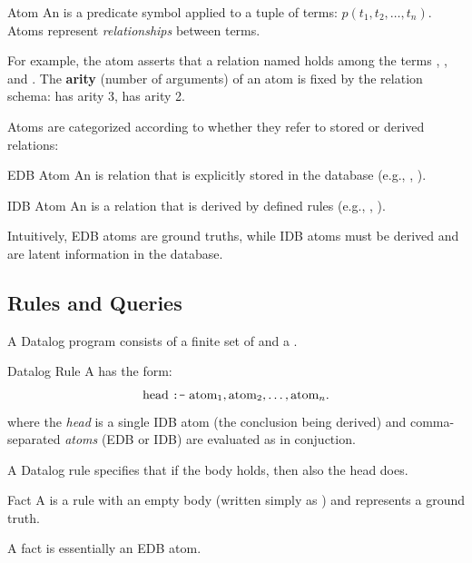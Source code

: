 \begin{definition}{Atom}
    An  is a predicate symbol applied to a tuple of terms: \(p(t_1, t_2, \dots, t_n)\). Atoms represent \emph{relationships} between terms.
\end{definition}
For example, the atom  asserts that a relation named  holds among the terms , , and . The \textbf{arity} (number of arguments) of an atom is fixed by the relation schema:  has arity 3,  has arity 2.

Atoms are categorized according to whether they refer to stored or derived relations:

\begin{definition}{EDB Atom}
    An  is relation that is explicitly stored in the database (e.g., , ).
\end{definition}

\begin{definition}{IDB Atom}
    An  is a relation that is derived by defined rules (e.g., , ).
\end{definition}

Intuitively, EDB atoms are ground truths, while IDB atoms must be derived and are latent information in the database.

\subsection{Rules and Queries}

A Datalog program consists of a finite set of  and a .

\begin{definition}{Datalog Rule}
    A  has the form:
    \[
    \text{head} \;\text{\texttt{:-}}\; \text{atom}_1, \text{atom}_2, \dots, \text{atom}_n .
    \]
    where the \emph{head} is a single IDB atom (the conclusion being derived) and comma-separated \emph{atoms} (EDB or IDB) are evaluated as in conjuction.
\end{definition}
A Datalog rule specifies that if the body holds, then also the head does.

\begin{definition}{Fact}
    A  is a rule with an empty body (written simply as ) and represents a ground truth.
\end{definition}
A fact is essentially an EDB atom.

